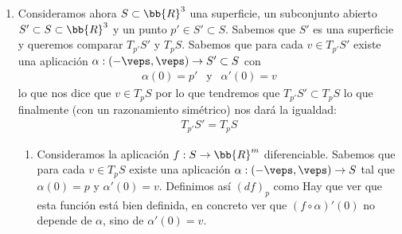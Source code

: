 \begin{ejemplo}
\begin{enumerate}
        \item Consideramos ahora $S\subset \bb{R}^3$ una superficie, un subconjunto abierto $S'\subset S \subset \bb{R}^3$ y un punto $p'\in S'\subset S$. Sabemos que $S'$ es una superficie y queremos comparar $T_{p'}S'$ y $T_pS$. Sabemos que para cada $v\in T_{p'}S'$ existe una aplicación $\alpha: (-\veps, \veps) \to S'\subset S$ con 
        \begin{gather*}
            \alpha(0) = p'\ \ \text{ y } \ \ \alpha'(0) = v
        \end{gather*}
        lo que nos dice que $v\in T_pS$ por lo que tendremos que $T_{p'}S'\subset T_pS$ lo que finalmente (con un razonamiento simétrico) nos dará la igualdad:
        \begin{gather*}
            T_{p'}S' = T_pS
        \end{gather*}

        \begin{enumerate}
            \item Consideramos la aplicación $f:S\to \bb{R}^m$ diferenciable. Sabemos que para cada $v\in T_pS$ existe una aplicación $\alpha: (-\veps, \veps) \to S$ tal que $\alpha(0)=p$ y $\alpha'(0)=v$.  Definimos así $(df)_p$ como 
            Hay que ver que esta función está bien definida, en concreto ver que $(f\circ \alpha)'(0)$ no depende de $\alpha$, sino de $\alpha'(0)=v$.
        \end{enumerate}
    \end{enumerate}
\end{ejemplo}